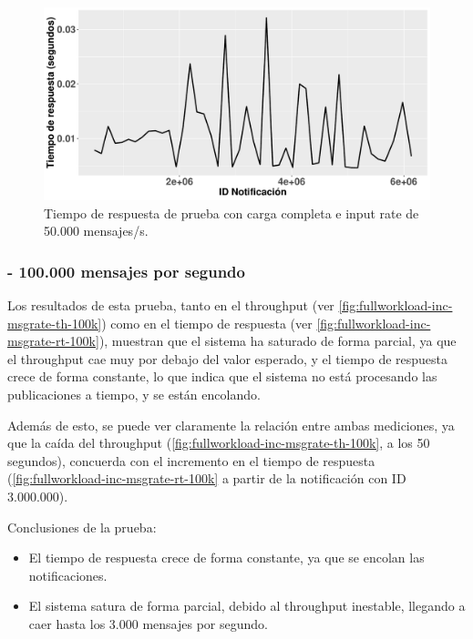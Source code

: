 \begin{figure}[htpb]
    \centering
    \includegraphics[width=\textwidth]{images/full-worklad-inc-msgrate/rt_full-workload-inc-msgrate_50k.pdf}
    \caption{Tiempo de respuesta de prueba con carga completa e input rate de 50.000 mensajes/s.}
    \label{fig:fullworkload-inc-msgrate-rt-50k}
\end{figure}


\subsubsection*{- 100.000 mensajes por segundo}

Los resultados de esta prueba, tanto en el throughput (ver 
\autoref{fig:fullworkload-inc-msgrate-th-100k}) como en el tiempo de respuesta
(ver \autoref{fig:fullworkload-inc-msgrate-rt-100k}), muestran que el sistema ha
saturado de forma parcial, ya que el throughput cae muy por debajo del valor
esperado, y el tiempo de respuesta crece de forma constante, lo que indica que
el sistema no está procesando las publicaciones a tiempo, y se están encolando.

Además de esto, se puede ver claramente la relación entre ambas mediciones,
ya que la caída del throughput (\autoref{fig:fullworkload-inc-msgrate-th-100k},
a los 50 segundos), concuerda con el incremento en el tiempo de respuesta
(\autoref{fig:fullworkload-inc-msgrate-rt-100k} a partir de la notificación
con ID 3.000.000).

Conclusiones de la prueba:
\begin{itemize}
    \item El tiempo de respuesta crece de forma constante, ya que se encolan las
    notificaciones.
    \item El sistema satura de forma parcial, debido al throughput inestable, llegando
    a caer hasta los 3.000 mensajes por segundo.
\end{itemize}

